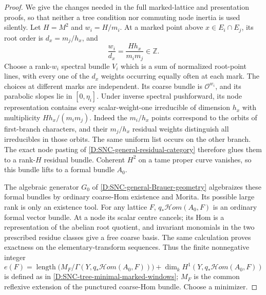 \begin{proof}
We give the changes needed in the full marked-lattice
and presentation proofs, so that neither a tree
condition nor commuting node inertia is used silently.
Let \(H=M^2\) and \(w_i=H/m_i\). At a marked point
above \(x\in E_i\cap E_j\), its root order is
\(d_x=m_j/h_x\), and
\[
           \frac{w_i}{d_x}
                   =\frac{Hh_x}{m_i m_j}\in\mathbb Z.   \tag{D.GP.3}
\]
Choose a rank-\(w_i\) spectral bundle \(V_i\) which is
a sum of normalized root-point lines, with every one
of the \(d_x\) weights occurring equally often at
each mark. The choices at different marks are
independent. Its coarse bundle is \(\mathcal O^{w_i}\),
and its parabolic slopes lie in \([0,\eta_i]\).
Under inverse spectral pushforward, its node
representation contains every scalar-weight-one
irreducible of dimension \(h_x\) with multiplicity
\(Hh_x/(m_i m_j)\). Indeed the \(m_i/h_x\) points
correspond to the orbits of first-branch characters,
and their \(m_j/h_x\) residual weights distinguish
all irreducibles in those orbits. The same uniform
list occurs on the other branch. The exact node
pasting of \ref{D:SNC-general-residual-category}
therefore glues them to a rank-\(H\) residual bundle.
Coherent \(H^2\) on a tame proper curve vanishes, so
this bundle lifts to a formal bundle \(A_0\).

The algebraic generator \(G_0\) of
\ref{D:SNC-general-Brauer-geometry} algebraizes these
formal bundles by ordinary coarse-Hom existence and
Morita. Its possible large rank is only an existence
tool. For any lattice \(F\),
\(q_*\mathcal Hom(A_0,F)\) is an ordinary formal
vector bundle. At a node its scalar centre cancels;
its Hom is a representation of the abelian root
quotient, and invariant monomials in the two
prescribed residue classes give a free coarse basis.
The same calculation proves exactness on the
elementary-transform sequences. Thus the finite
nonnegative integer
\[
 e(F)=\operatorname{length}
       \bigl(M_F/\Gamma(Y,q_*\mathcal Hom(A_0,F))\bigr)
              +\dim_kH^1(Y,q_*\mathcal Hom(A_0,F))       \tag{D.GP.4}
\]
is defined as in \ref{D:SNC-tree-minimal-marked-windows};
\(M_F\) is the common reflexive extension of the
punctured coarse-Hom bundle. Choose a minimizer.


\end{proof}
